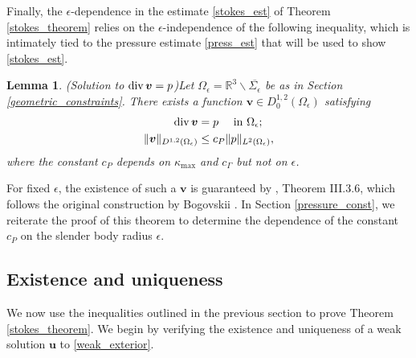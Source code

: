 \documentclass[11pt]{article}
\numberwithin{equation}{section}
\newcommand{\R}{\mathbb{R}}
\newcommand{\bu}{\bm{u}}
\newcommand{\bv}{\bm{v}}
\newcommand{\ts}{\thinspace}
\newcommand{\dive}{{\rm{div}}}
\newtheorem{lemma}[theorem]{Lemma}
\theoremstyle{definition}
\begin{document}

Finally, the $\epsilon$-dependence in the estimate \eqref{stokes_est} of Theorem \ref{stokes_theorem} relies on the $\epsilon$-independence of the following inequality, which is intimately tied to the pressure estimate \eqref{press_est} that will be used to show \eqref{stokes_est}. 

\begin{lemma}{\emph{(Solution to $\dive\ts \bv=p$)}}\label{divv_p_lem} 
Let $\Omega_{\epsilon}=\R^3\backslash \overline{\Sigma_{\epsilon}}$ be as in Section \ref{geometric_constraints}. There exists a function $\bv\in D^{1,2}_0(\Omega_{\epsilon})$ satisfying 
\begin{align*}
\dive\ts \bv &= p \quad \text{ in }\Omega_{\epsilon}; \\
\|\bv\|_{D^{1,2}(\Omega_{\epsilon})} &\le c_P\| p\|_{L^2(\Omega_{\epsilon})}, 
\end{align*}
where the constant $c_P$ depends on $\kappa_{\max}$ and $c_{\Gamma}$ but not on $\epsilon$. 
\end{lemma}
For fixed $\epsilon$, the existence of such a $\bv$ is guaranteed by \cite{galdi2011introduction}, Theorem III.3.6, which follows the original construction by Bogovskii \cite{bogovskii1980solutions}. In Section \ref{pressure_const}, we reiterate the proof of this theorem to determine the dependence of the constant $c_P$ on the slender body radius $\epsilon$. 



\subsection{Existence and uniqueness}\label{EandU_stokes}
We now use the inequalities outlined in the previous section to prove Theorem \ref{stokes_theorem}. We begin by verifying the existence and uniqueness of a weak solution $\bu$ to \eqref{weak_exterior}. 
\end{document}
